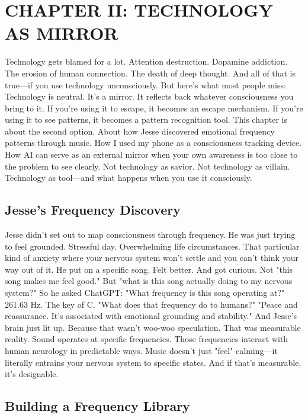 \documentclass[12pt,openany]{book}
\begin{document}
\cleardoublepage

\chapter{CHAPTER II: TECHNOLOGY AS MIRROR}

Technology gets blamed for a lot.
Attention destruction. Dopamine addiction. The erosion of human connection. The death of deep thought.
And all of that is true—if you use technology unconsciously.
But here's what most people miss: Technology is neutral. It's a mirror.
It reflects back whatever consciousness you bring to it. If you're using it to escape, it becomes an escape mechanism. If you're using it to see patterns, it becomes a pattern recognition tool.
This chapter is about the second option.
About how Jesse discovered emotional frequency patterns through music. How I used my phone as a consciousness tracking device. How AI can serve as an external mirror when your own awareness is too close to the problem to see clearly.
Not technology as savior. Not technology as villain. Technology as tool—and what happens when you use it consciously.

\section{Jesse's Frequency Discovery}

Jesse didn't set out to map consciousness through frequency. He was just trying to feel grounded.
Stressful day. Overwhelming life circumstances. That particular kind of anxiety where your nervous system won't settle and you can't think your way out of it.
He put on a specific song. Felt better. And got curious.
Not "this song makes me feel good." But "what is this song actually doing to my nervous system?"
So he asked ChatGPT: "What frequency is this song operating at?"
261.63 Hz. The key of C.
"What does that frequency do to humans?"
"Peace and reassurance. It's associated with emotional grounding and stability."
And Jesse's brain just lit up.
Because that wasn't woo-woo speculation. That was measurable reality. Sound operates at specific frequencies. Those frequencies interact with human neurology in predictable ways. Music doesn't just "feel" calming—it literally entrains your nervous system to specific states.
And if that's measurable, it's designable.

\section{Building a Frequency Library}
\end{document}
